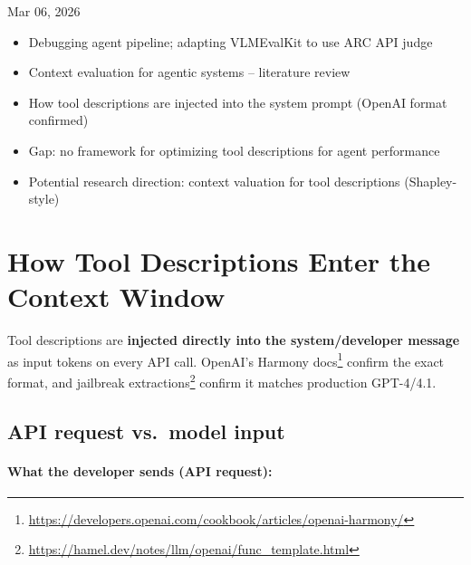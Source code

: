 \meetingheader
    {Mar 06, 2026}
    {}
    {}
    {\begin{itemize}
        \item Debugging agent pipeline; adapting VLMEvalKit to use ARC API judge
        \item Context evaluation for agentic systems -- literature review
        \item How tool descriptions are injected into the system prompt (OpenAI format confirmed)
        \item Gap: no framework for optimizing tool descriptions for agent performance
        \item Potential research direction: context valuation for tool descriptions (Shapley-style)
    \end{itemize}}
    {}



\newpage
\section{How Tool Descriptions Enter the Context Window}

Tool descriptions are \textbf{injected directly into the system/developer message} as input tokens on every API call.
OpenAI's Harmony docs\footnote{\url{https://developers.openai.com/cookbook/articles/openai-harmony/}} confirm the exact format, and jailbreak extractions\footnote{\url{https://hamel.dev/notes/llm/openai/func\_template.html}} confirm it matches production GPT-4/4.1.

\subsection{API request vs.\ model input}

\paragraph{What the developer sends (API request):}

